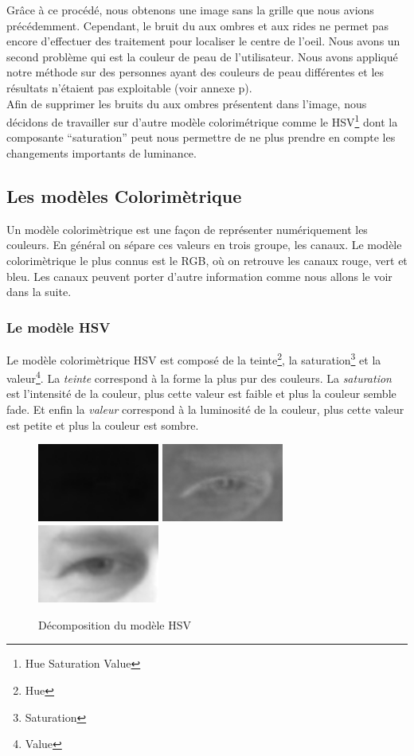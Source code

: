 Grâce à ce procédé, nous obtenons une image sans la grille que nous avions précédemment. Cependant,
le bruit du aux ombres et aux rides ne permet pas encore d'effectuer des traitement pour localiser le centre de l'oeil.
Nous avons un second problème qui est la couleur de peau de l'utilisateur. Nous avons appliqué notre méthode 
sur des personnes ayant des couleurs de peau différentes et les résultats n'étaient pas exploitable (voir annexe p\pageref{resultCanny}).\\ 

Afin de supprimer les bruits du aux ombres présentent dans l'image, nous décidons de travailler sur d'autre modèle
colorimétrique comme le HSV\footnote{Hue Saturation Value} dont la composante \enquote{saturation} peut nous
permettre de ne plus prendre en compte les changements importants de luminance.

\subsection{Les modèles Colorimètrique}
Un modèle colorimètrique est une façon de représenter numériquement les couleurs. En général on sépare ces valeurs en trois groupe, les canaux.
Le modèle colorimètrique le plus connus est le RGB, où on retrouve les canaux rouge, vert et bleu. Les canaux peuvent porter
d'autre information comme nous allons le voir dans la suite.

\subsubsection{Le modèle HSV}
Le modèle colorimètrique HSV est composé de la teinte\footnote{Hue}, la saturation\footnote{Saturation} et la valeur\footnote{Value}.
La \textit{teinte} correspond à la forme la plus pur des couleurs. La \textit{saturation} est l'intensité de la couleur, plus cette valeur est faible
et plus la couleur semble fade. Et enfin la \textit{valeur} correspond à la luminosité de la couleur, plus cette valeur est petite et plus la
couleur est sombre.

\begin{figure}[H]
 \center
 \includegraphics[width=4cm]{image/hue.png}
 \includegraphics[width=4cm]{image/saturation.png}
 \includegraphics[width=4cm]{image/value.png}
 \caption{Décomposition du modèle HSV}
\end{figure}


